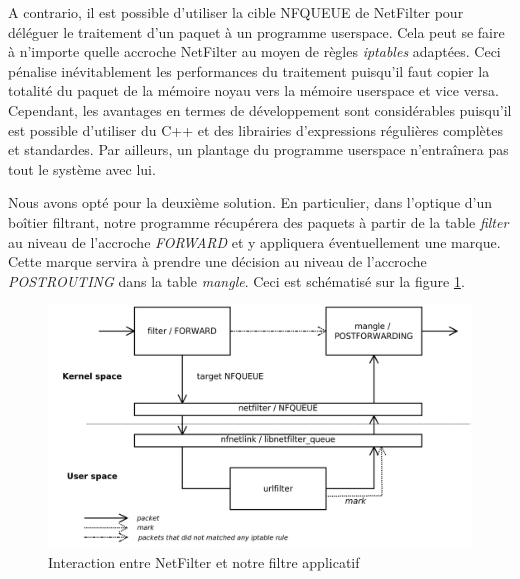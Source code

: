 A contrario, il est possible d'utiliser la cible NFQUEUE de NetFilter
pour déléguer le traitement d'un paquet à un programme userspace. Cela
peut se faire à n'importe quelle accroche NetFilter au moyen de règles
\textit{iptables} adaptées. Ceci pénalise inévitablement les
performances du traitement puisqu'il faut copier la totalité du paquet
de la mémoire noyau vers la mémoire userspace et vice
versa. Cependant, les avantages en termes de développement sont
considérables puisqu'il est possible d'utiliser du C++ et des
librairies d'expressions régulières complètes et standardes. Par
ailleurs, un plantage du programme userspace n'entraînera pas tout le
système avec lui.

Nous avons opté pour la deuxième solution. En particulier, dans
l'optique d'un boîtier filtrant, notre programme récupérera des
paquets à partir de la table \textit{filter} au niveau de l'accroche
\textit{FORWARD} et y appliquera éventuellement une marque. Cette
marque servira à prendre une décision au niveau de l'accroche
\textit{POSTROUTING} dans la table \textit{mangle}. Ceci est
schématisé sur la figure \ref{schema1}.

\begin{figure}[h]
  \begin{center}
    \includegraphics[scale=0.2]{schema1.png}
    \caption{Interaction entre NetFilter et notre filtre applicatif}
    \label{schema1}
  \end{center}
\end{figure}
